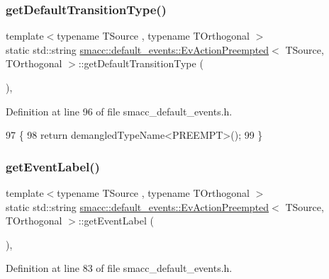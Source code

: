 \subsubsection{\texorpdfstring{get\+Default\+Transition\+Type()}{getDefaultTransitionType()}}
{\footnotesize\ttfamily template$<$typename T\+Source , typename T\+Orthogonal $>$ \\
static std\+::string \hyperlink{structsmacc_1_1default__events_1_1EvActionPreempted}{smacc\+::default\+\_\+events\+::\+Ev\+Action\+Preempted}$<$ T\+Source, T\+Orthogonal $>$\+::get\+Default\+Transition\+Type (\begin{DoxyParamCaption}{ }\end{DoxyParamCaption})\hspace{0.3cm}{\ttfamily [inline]}, {\ttfamily [static]}}



Definition at line 96 of file smacc\+\_\+default\+\_\+events.\+h.


\begin{DoxyCode}
97   \{
98     \textcolor{keywordflow}{return} demangledTypeName<PREEMPT>();
99   \}
\end{DoxyCode}
\mbox{\label{structsmacc_1_1default__events_1_1EvActionPreempted_a18ec7c245789fe0571a70ae7cc65be18}} 
\subsubsection{\texorpdfstring{get\+Event\+Label()}{getEventLabel()}}
{\footnotesize\ttfamily template$<$typename T\+Source , typename T\+Orthogonal $>$ \\
static std\+::string \hyperlink{structsmacc_1_1default__events_1_1EvActionPreempted}{smacc\+::default\+\_\+events\+::\+Ev\+Action\+Preempted}$<$ T\+Source, T\+Orthogonal $>$\+::get\+Event\+Label (\begin{DoxyParamCaption}{ }\end{DoxyParamCaption})\hspace{0.3cm}{\ttfamily [inline]}, {\ttfamily [static]}}



Definition at line 83 of file smacc\+\_\+default\+\_\+events.\+h.


